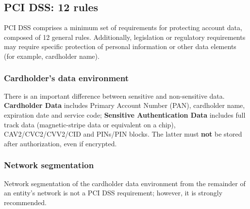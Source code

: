\documentclass[a4paper, 10pt, titlepage]{article}
\begin{document}
\subsection{PCI DSS: 12 rules}
PCI DSS comprises a minimum set of requirements for protecting account data, composed of 12 general rules. Additionally, legislation or regulatory requirements may require specific protection of personal information or other data elements (for example, cardholder name).

\subsubsection{Cardholder's data environment}
There is an important difference between sensitive and non-sensitive data.
\textbf{Cardholder Data} includes Primary Account Number (PAN), cardholder name, expiration date and service code; \textbf{Sensitive Authentication Data} includes full track data (magnetic-stripe data or equivalent on a chip), CAV2/CVC2/CVV2/CID and PINs/PIN blocks. The latter must \textbf{not} be stored after authorization, even if encrypted.

\subsubsection{Network segmentation}
Network segmentation of the cardholder data environment from the remainder of an entity's network is not a PCI DSS requirement; however, it is strongly recommended.
\end{document}
